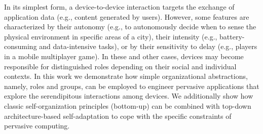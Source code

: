 In its simplest form, a device-to-device interaction targets the exchange of application data (e.g., content generated by users). However, some features are characterized by their autonomy 
(e.g., to autonomously decide when to sense the physical environment in specific areas of a city), their intensity (e.g., battery-consuming and data-intensive tasks), or by their sensitivity to delay (e.g., players in a mobile multiplayer game). In these and other cases, devices may become responsible for distinguished roles depending on their social and individual contexts. In this work we demonstrate how simple organizational abstractions, namely, roles and groups, can be employed to engineer pervasive applications that explore the serendipitous interactions among devices. We additionally show how classic self-organization principles (bottom-up) can be combined with top-down architecture-based self-adaptation to cope with the specific constraints of pervasive computing.







